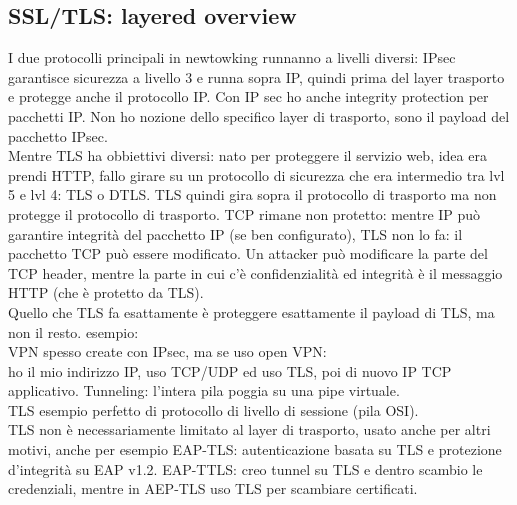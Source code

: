 \documentclass[16px]{article}
\begin{document}
\subsection{SSL/TLS: layered overview}
I due protocolli principali in newtowking runnanno a livelli diversi: IPsec garantisce sicurezza a livello 3 e runna sopra IP, quindi prima del layer trasporto e protegge anche il protocollo IP. Con IP sec ho anche integrity protection per pacchetti IP. Non ho nozione dello specifico layer di trasporto, sono il payload del pacchetto IPsec.\\ Mentre TLS ha obbiettivi diversi: nato per proteggere il servizio web, idea era prendi HTTP, fallo girare su un protocollo di sicurezza che era intermedio tra lvl 5 e lvl 4: TLS o DTLS. TLS quindi gira sopra il protocollo di trasporto ma non protegge il protocollo di trasporto. TCP rimane non protetto: mentre IP può garantire integrità del pacchetto IP (se ben configurato), TLS non lo fa: il pacchetto TCP può essere modificato. Un attacker può modificare la parte del TCP header, mentre la parte in cui c'è confidenzialità ed integrità è il messaggio HTTP (che è protetto da TLS).\\ Quello che TLS fa esattamente è proteggere esattamente il payload di TLS, ma non il resto. esempio: \\VPN spesso create con IPsec, ma se uso open VPN: \\
ho il mio indirizzo IP, uso TCP/UDP ed uso TLS, poi di nuovo IP TCP applicativo. Tunneling: l'intera pila poggia su una pipe virtuale.\\ TLS esempio perfetto di protocollo di livello di sessione (pila OSI).\\ TLS non è necessariamente limitato al layer di trasporto, usato anche per altri motivi, anche per esempio EAP-TLS: autenticazione basata su TLS e protezione d'integrità su EAP v1.2. EAP-TTLS: creo tunnel su TLS e dentro scambio le credenziali, mentre in AEP-TLS uso TLS per scambiare certificati.
\end{document}
